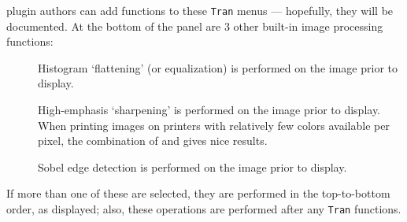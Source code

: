 \afnit plugin authors can add functions
to these {\tt Tran} menus --- hopefully, they will be documented.
At the bottom of the  panel are 3 other built-in image processing
functions:
\begin{description}
  \item[\blob{}]  Histogram `flattening' (or equalization) is
                             performed on the image prior to display.
  \item[\blob{}]  High-emphasis `sharpening' is performed on
                             the image prior to display.  When printing images
                             on printers with relatively few colors available
                             per pixel,
                             the combination of  and 
                             gives nice results.
  \item[\blob{}] Sobel edge detection is performed on
                             the image prior to display.
\end{description}
If more than one of these are selected, they are performed in the
top-to-bottom order, as displayed; also, these operations are performed
after any {\tt Tran} functions.

